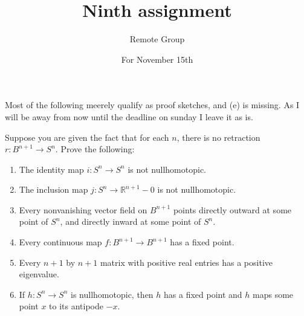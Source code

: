 \documentclass[11pt]{article}
\title{Ninth assignment}
\author{Remote Group}
\date{For November 15th} %
\begin{document}
\maketitle

Most of the following meerely qualify as proof sketches, 
and (e) is missing. As I will be away from now 
until the deadline on sunday I leave it as is. 

\begin{prob*}[Munkres 55.4]
    Suppose you are given the fact that 
    for each $n$, there is no retraction 
    $r : B^{n+1} \to S^n$. Prove the following: 
    \begin{enumerate}[label=(\alph*)]
        \item The identity map $i : S^n \to S^n$ is not
            nullhomotopic. 
        \item The inclusion map $j : S^n \to 
            \mathbb R^{n+1} - 0$ is not nullhomotopic. 
        \item Every nonvanishing vector field 
            on $B^{n+1}$ points directly outward at 
            some point of $S^n$, and directly inward 
            at some point of $S^n$. 
        \item Every continuous map $f : B^{n+1} \to B^{n+1}$ 
            has a fixed point. 
        \item Every $n + 1$ by $n+1$ matrix with 
            positive real entries has a positive 
            eigenvalue. 
        \item If $h : S^n \to S^n$ is nullhomotopic, then 
            $h$ has a fixed point and $h$ maps 
            some point $x$ to its antipode $-x$.
    \end{enumerate}
\end{prob*}
\end{document}
